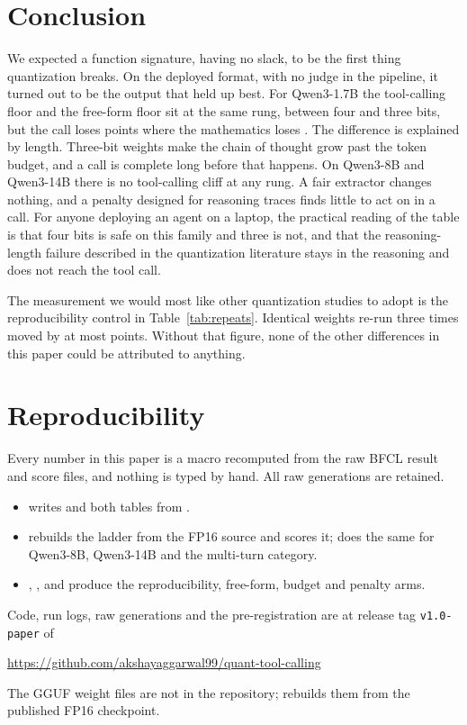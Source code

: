 \documentclass[11pt]{article}
\newcommand{\bfcl}{BFCL}
\newcommand{\qm}{Qwen3-1.7B}
\begin{document}
\section{Conclusion}

We expected a function signature, having no slack, to be the first thing quantization breaks. On the deployed format, with no judge in the pipeline, it turned out to be the output that held up best. For \qm{} the tool-calling floor and the free-form floor sit at the same rung, between four and three bits, but the call loses \qtDropThree{} points where the mathematics loses \qtGsmDropThree{}. The difference is explained by length. Three-bit weights make the chain of thought grow past the token budget, and a call is complete long before that happens. On Qwen3-8B and Qwen3-14B there is no tool-calling cliff at any rung. A fair extractor changes nothing, and a penalty designed for reasoning traces finds little to act on in a call. For anyone deploying an agent on a laptop, the practical reading of the table is that four bits is safe on this family and three is not, and that the reasoning-length failure described in the quantization literature stays in the reasoning and does not reach the tool call.

The measurement we would most like other quantization studies to adopt is the reproducibility control in Table~\ref{tab:repeats}. Identical weights re-run three times moved by at most \qtMaxRepRange{} points. Without that figure, none of the other differences in this paper could be attributed to anything.

\section*{Reproducibility}
Every number in this paper is a macro recomputed from the raw \bfcl{} result and score files, and nothing is typed by hand. All raw generations are retained.
\begin{itemize}\setlength{\itemsep}{0pt}
\item {} writes  and both tables from .
\item {} rebuilds the ladder from the FP16 source and scores it;  does the same for Qwen3-8B, Qwen3-14B and the multi-turn category.
\item {}, ,  and  produce the reproducibility, free-form, budget and penalty arms.
\end{itemize}
Code, run logs, raw generations and the pre-registration are at release tag \texttt{v1.0-paper} of
\begin{center}\url{https://github.com/akshayaggarwal99/quant-tool-calling}\end{center}
The GGUF weight files are not in the repository;  rebuilds them from the published FP16 checkpoint.



\end{document}
